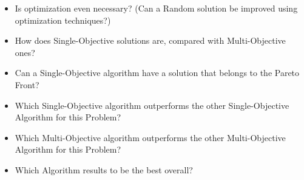 \begin{itemize}

\item Is optimization even necessary? (Can a Random solution be improved using optimization techniques?)

\item How does Single-Objective solutions are, compared with Multi-Objective ones?

\item Can a Single-Objective algorithm have a solution that belongs to the Pareto Front?

\item Which Single-Objective algorithm outperforms the other Single-Objective Algorithm for this Problem?

\item Which Multi-Objective algorithm outperforms the other Multi-Objective Algorithm for this Problem?

\item Which Algorithm results to be the best overall?

\end{itemize}


